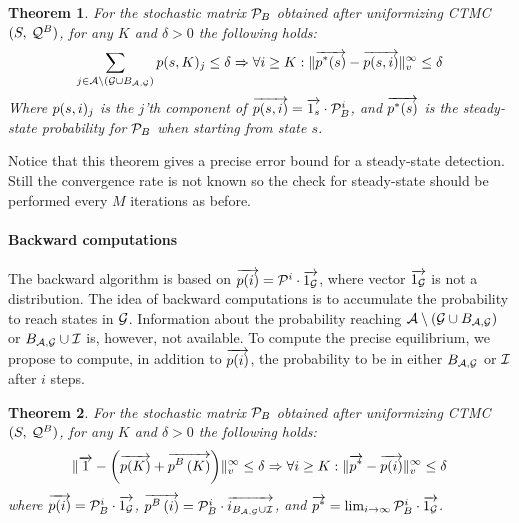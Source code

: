 \documentclass[times, 10pt,twocolumn]{article}
\newtheorem{theorem}{Theorem}
\begin{document}
	\begin{theorem}
		For the stochastic matrix $\mathcal{P}_{B}$ obtained after uniformizing CTMC $(S,\:\mathcal{Q}^{B})$, for any $K$ and $\delta > 0$ the following holds:
			{\small
			\[
				\sum_{j \in \mathcal{A} \setminus \left( \mathcal{G} \cup B_{ \mathcal{A}, \mathcal{G} } \right)} p(s,K)_{j} \leq \delta \Rightarrow \forall i \geq K : \lVert  \overrightarrow{p^{*}(s)} - \overrightarrow{p(s,i)}  \rVert_{v}^{\infty} \leq \delta
			 \]
			 }
		Where $p(s,i)_{j}$ is the $j$'th component of $\overrightarrow{p(s,i)} = \overrightarrow{1_{s} } \cdot \mathcal{P}_{B}^{i} $, and $\overrightarrow{p^{*}(s)}$ is the steady-state probability for $\mathcal{P}_{B}$ when starting from state $s$. \label{th:criteria_1}
	 \end{theorem}
	
	Notice that this theorem gives a precise error bound for a steady-state detection. Still the convergence rate is not known so the check for steady-state should be performed every $M$ iterations as before.
	
	\paragraph{Backward computations}	 
	The backward algorithm is based on $\overrightarrow{p(i)} = \mathcal{P}^{i} \cdot \overrightarrow{1_{\mathcal{G}}}$, where vector $\overrightarrow{1_{\mathcal{G}}}$ is not a distribution. The idea of backward computations is to accumulate the probability to reach states in $\mathcal{G}$. Information about the probability reaching $\mathcal{A} \setminus \left( \mathcal{G} \cup B_{ \mathcal{A}, \mathcal{G} } \right)$ or $B_{ \mathcal{A}, \mathcal{G} } \cup \mathcal{I}$ is, however, not available. To compute the precise equilibrium, we propose to compute, in addition to $\overrightarrow{p(i)}$, the probability to be in either $B_{ \mathcal{A}, \mathcal{G} }$ or $\mathcal{I}$ after $i$ steps.
	
	\begin{theorem}
		For the stochastic matrix $\mathcal{P}_{B}$ obtained after uniformizing CTMC $(S,\:\mathcal{Q}^{B})$, for any $K$ and $\delta > 0$ the following holds:
			{\small
			\[
				\lVert   \overrightarrow{1} - \left( \overrightarrow{p(K)} + \overrightarrow{p^{B}\left( K \right)} \right)   \rVert_{v}^{\infty} \leq \delta \Rightarrow \forall i \geq K : \lVert  \overrightarrow{p^{*}} - \overrightarrow{p(i)}  \rVert_{v}^{\infty} \leq \delta
			 \]
			 }
		where $\overrightarrow{p(i)} = \mathcal{P}_{B}^{i} \cdot \overrightarrow{1_{\mathcal{G}}}$, $\overrightarrow{p^{B}\left( i \right)} = \mathcal{P}_{B}^{i} \cdot \overrightarrow {i_{B_{ \mathcal{A}, \mathcal{G} } \cup \mathcal{I}}}$, and $\overrightarrow{p^{*}} = \lim_{i \rightarrow \infty} \mathcal{P}_{B}^{i} \cdot \overrightarrow{1_{\mathcal{G}}}$. \label{th:criteria_2}
	\end{theorem}
	
\end{document}
